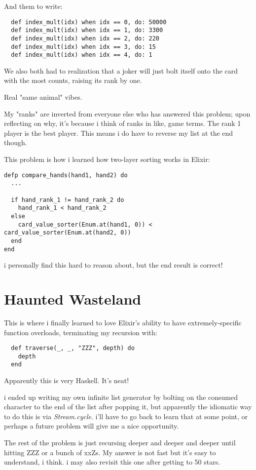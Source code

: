 \documentclass{article}
\begin{document}
And them to write:
\begin{verbatim}
  def index_mult(idx) when idx == 0, do: 50000
  def index_mult(idx) when idx == 1, do: 3300
  def index_mult(idx) when idx == 2, do: 220
  def index_mult(idx) when idx == 3, do: 15
  def index_mult(idx) when idx == 4, do: 1
\end{verbatim}

We also both had to realization that a joker will just bolt itself onto the card with the most counts, raising its rank by one.

Real "same animal" vibes.

My "ranks" are inverted from everyone else who has answered this problem; upon reflecting on why, it's because i think of ranks in like, game terms. The rank 1 player is the best player. This means i do have to reverse my list at the end though.

This problem is how i learned how two-layer sorting works in Elixir:
\begin{verbatim}
defp compare_hands(hand1, hand2) do
  ...

  if hand_rank_1 != hand_rank_2 do
    hand_rank_1 < hand_rank_2
  else
    card_value_sorter(Enum.at(hand1, 0)) < card_value_sorter(Enum.at(hand2, 0))
  end
end
\end{verbatim}

i personally find this hard to reason about, but the end result is correct!

\section{Haunted Wasteland}

This is where i finally learned to love Elixir's ability to have extremely-specific function overloads, terminating my recursion with:
\begin{verbatim}
  def traverse(_, _, "ZZZ", depth) do
    depth
  end
\end{verbatim}

Apparently this is very Haskell. It's neat!

i ended up writing my own infinite list generator by bolting on the consumed character to the end of the list after popping it, but apparently the idiomatic way to do this is via \textit{Stream.cycle}. i'll have to go back to learn that at some point, or perhaps a future problem will give me a nice opportunity.

The rest of the problem is just recursing deeper and deeper and deeper until hitting ZZZ or a bunch of xxZs. My answer is not fast but it's easy to understand, i think. i may also revisit this one after getting to 50 stars.
\end{document}
